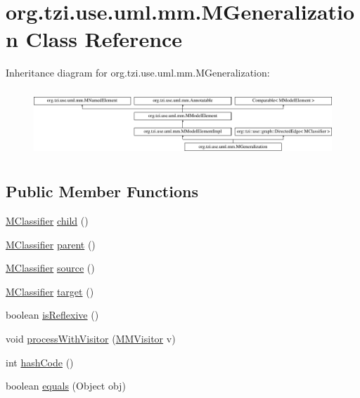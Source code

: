 \hypertarget{classorg_1_1tzi_1_1use_1_1uml_1_1mm_1_1_m_generalization}{\section{org.\-tzi.\-use.\-uml.\-mm.\-M\-Generalization Class Reference}
\label{classorg_1_1tzi_1_1use_1_1uml_1_1mm_1_1_m_generalization}
}
Inheritance diagram for org.\-tzi.\-use.\-uml.\-mm.\-M\-Generalization\-:\begin{figure}[H]
\begin{center}
\leavevmode
\includegraphics[height=2.548350cm]{classorg_1_1tzi_1_1use_1_1uml_1_1mm_1_1_m_generalization}
\end{center}
\end{figure}
\subsection*{Public Member Functions}
\begin{DoxyCompactItemize}
\item 
\hyperlink{interfaceorg_1_1tzi_1_1use_1_1uml_1_1mm_1_1_m_classifier}{M\-Classifier} \hyperlink{classorg_1_1tzi_1_1use_1_1uml_1_1mm_1_1_m_generalization_a03762394efc9793aba789f2247552594}{child} ()
\item 
\hyperlink{interfaceorg_1_1tzi_1_1use_1_1uml_1_1mm_1_1_m_classifier}{M\-Classifier} \hyperlink{classorg_1_1tzi_1_1use_1_1uml_1_1mm_1_1_m_generalization_a52174b0f2d3a88e8ff46ca64a0a0a116}{parent} ()
\item 
\hyperlink{interfaceorg_1_1tzi_1_1use_1_1uml_1_1mm_1_1_m_classifier}{M\-Classifier} \hyperlink{classorg_1_1tzi_1_1use_1_1uml_1_1mm_1_1_m_generalization_a44b957fbd28fda9018a9eb176d58c379}{source} ()
\item 
\hyperlink{interfaceorg_1_1tzi_1_1use_1_1uml_1_1mm_1_1_m_classifier}{M\-Classifier} \hyperlink{classorg_1_1tzi_1_1use_1_1uml_1_1mm_1_1_m_generalization_a457385702a1f2bc3e8274f7736b97a13}{target} ()
\item 
boolean \hyperlink{classorg_1_1tzi_1_1use_1_1uml_1_1mm_1_1_m_generalization_a7fb3f39f1949117c41b088545d3c4a46}{is\-Reflexive} ()
\item 
void \hyperlink{classorg_1_1tzi_1_1use_1_1uml_1_1mm_1_1_m_generalization_a5ecb76d8cdf592ef6b2eda3f65c1a090}{process\-With\-Visitor} (\hyperlink{interfaceorg_1_1tzi_1_1use_1_1uml_1_1mm_1_1_m_m_visitor}{M\-M\-Visitor} v)
\item 
int \hyperlink{classorg_1_1tzi_1_1use_1_1uml_1_1mm_1_1_m_generalization_ac7c4db718784e6d5836171f38f28e87d}{hash\-Code} ()
\item 
boolean \hyperlink{classorg_1_1tzi_1_1use_1_1uml_1_1mm_1_1_m_generalization_a0f5582c48e5baf527c7df2d289cae001}{equals} (Object obj)
\end{DoxyCompactItemize}
